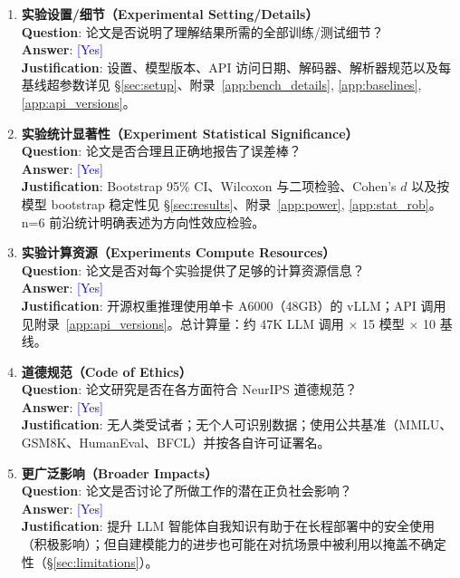 \documentclass[11pt,a4paper,fontset=fandol]{ctexart}
\newcommand{\answerYes}[1][]{\textcolor{blue}{[Yes]#1}}
\begin{document}
\begin{enumerate}
\item {\bf 实验设置/细节（Experimental Setting/Details）}\\
\textbf{Question}: 论文是否说明了理解结果所需的全部训练/测试细节？\\
\textbf{Answer}: \answerYes{}\\
\textbf{Justification}: 设置、模型版本、API 访问日期、解码器、解析器规范以及每基线超参数详见 \S\ref{sec:setup}、附录~\ref{app:bench_details}, \ref{app:baselines}, \ref{app:api_versions}。

\item {\bf 实验统计显著性（Experiment Statistical Significance）}\\
\textbf{Question}: 论文是否合理且正确地报告了误差棒？\\
\textbf{Answer}: \answerYes{}\\
\textbf{Justification}: Bootstrap 95\% CI、Wilcoxon 与二项检验、Cohen's $d$ 以及按模型 bootstrap 稳定性见 \S\ref{sec:results}、附录~\ref{app:power}, \ref{app:stat_rob}。n=6 前沿统计明确表述为方向性效应检验。

\item {\bf 实验计算资源（Experiments Compute Resources）}\\
\textbf{Question}: 论文是否对每个实验提供了足够的计算资源信息？\\
\textbf{Answer}: \answerYes{}\\
\textbf{Justification}: 开源权重推理使用单卡 A6000（48GB）的 vLLM；API 调用见附录~\ref{app:api_versions}。总计算量：约 47K LLM 调用 $\times$ 15 模型 $\times$ 10 基线。

\item {\bf 道德规范（Code of Ethics）}\\
\textbf{Question}: 论文研究是否在各方面符合 NeurIPS 道德规范？\\
\textbf{Answer}: \answerYes{}\\
\textbf{Justification}: 无人类受试者；无个人可识别数据；使用公共基准（MMLU、GSM8K、HumanEval、BFCL）并按各自许可证署名。

\item {\bf 更广泛影响（Broader Impacts）}\\
\textbf{Question}: 论文是否讨论了所做工作的潜在正负社会影响？\\
\textbf{Answer}: \answerYes{}\\
\textbf{Justification}: 提升 LLM 智能体自我知识有助于在长程部署中的安全使用（积极影响）；但自建模能力的进步也可能在对抗场景中被利用以掩盖不确定性（\S\ref{sec:limitations}）。


\end{enumerate}
\end{document}
